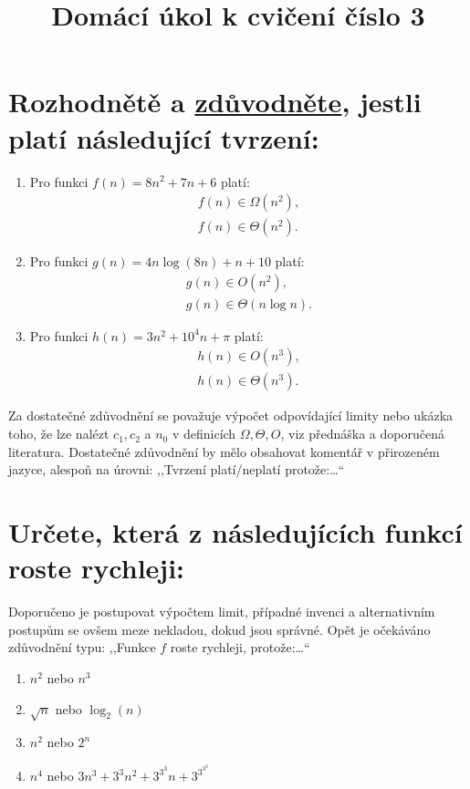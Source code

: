 \documentclass[12pt,oneside]{article}
\title{Domácí úkol k cvičení číslo 3}
\author{}
\begin{document}
	\maketitle
	\section{Rozhodnětě a \underline{zdůvodněte}, jestli platí následující tvrzení:}
		\begin{enumerate}
		\item Pro funkci $f(n) = 8n^2 + 7n + 6$ platí:
		\begin{align}
			f(n) \in \Omega(n^2), \\
			f(n) \in \Theta(n^2).
		\end{align}
		\item Pro funkci $g(n) = 4n\log(8n) + n + 10$ platí:
		\begin{align}
			g(n) \in O(n^2), \\
			g(n) \in \Theta(n\log n).
		\end{align}
		\item Pro funkci $h(n) = 3n^2 + 10^4n+  \pi $ platí:
		\begin{align}
			h(n) \in O(n^3) ,\\
			h(n) \in \Theta(n^3).
		\end{align}
	\end{enumerate}
	Za dostatečné zdůvodnění se považuje výpočet odpovídající limity nebo ukázka toho, že lze nalézt $c_1, c_2$ a $n_0$ v definicích $\Omega, \Theta, O$, viz přednáška a doporučená literatura.
	Dostatečné zdůvodnění by mělo obsahovat komentář v přirozeném jazyce, alespoň na úrovni: ,,Tvrzení platí/neplatí protože:\dots``
	
	\section{Určete, která z následujících funkcí roste rychleji:}
	Doporučeno je postupovat výpočtem limit, případné invenci a alternativním postupům se ovšem meze nekladou, dokud jsou správné.
	Opět je očekáváno zdůvodnění typu: ,,Funkce $f$ roste rychleji, protože:\dots``
	\begin{enumerate}
		\item $n^2$ nebo $n^3$
		\item $\sqrt{n}$ nebo $\log_2(n)$
		\item $n^2$ nebo $2^n$
		\item $n^4$ nebo $3n^3 + 3^3n^2 + 3^{3^3}n + 3^{3^{3^3}}$
	\end{enumerate}
	
\end{document}
